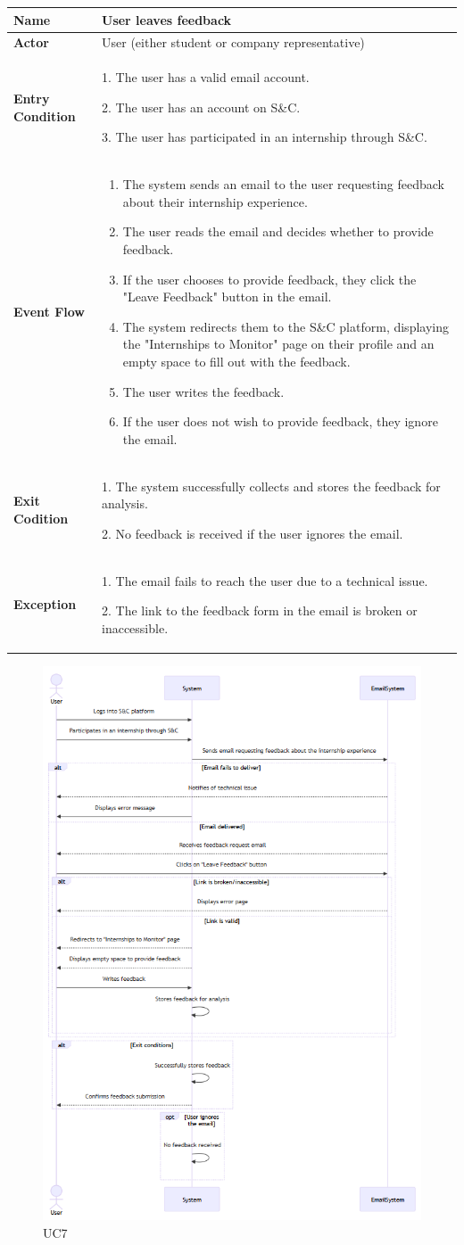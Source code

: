 \begin{longtable}{|p{}|p{}|}
\hline
\textbf{Name} &  User leaves feedback\\
\hline
\textbf{Actor} &  User (either student or company representative)\\
\hline
\textbf{Entry Condition} &  
1. The user has a valid email account.

2. The user has an account on S\&C.

3. The user has participated in an internship through S\&C.\\
\hline
\textbf{Event Flow} &  
\begin{enumerate}
    \item The system sends an email to the user requesting feedback about their internship experience.
    \item The user reads the email and decides whether to provide feedback.
    \item If the user chooses to provide feedback, they click the "Leave Feedback" button in the email.
    \item The system redirects them to the S\&C platform, displaying the "Internships to Monitor" page on their profile and an empty space to fill out with the feedback.	
    \item The user writes the feedback.
    \item  If the user does not wish to provide feedback, they ignore the email.
\end{enumerate}\\
\hline
\textbf{Exit Codition} & 
1. The system successfully collects and stores the feedback for analysis.

2. No feedback is received if the user ignores the email.\\
\hline
\textbf{Exception} &  
1. The email fails to reach the user due to a technical issue.	

2. The link to the feedback form in the email is broken or inaccessible.\\
\hline
\end{longtable}

\begin{figure}[H]
    \centering
    \includegraphics[width=0.5\linewidth]{RASD//Images/UC7.png}
    \caption{UC7}
\end{figure}

